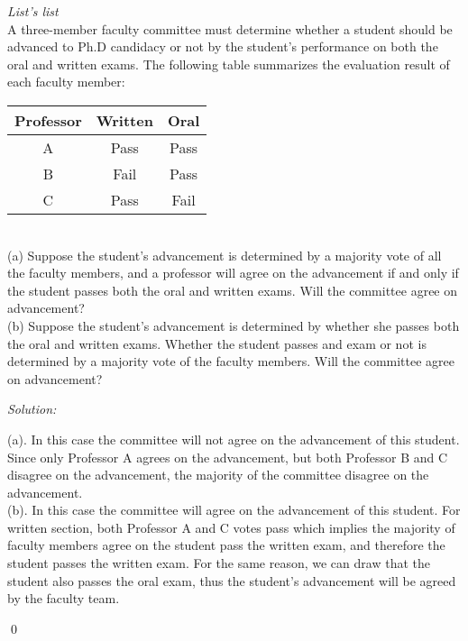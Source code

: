 \documentclass[12pt]{article}
\newenvironment{problem}[2][Problem]{\begin{trivlist}
\item[\hskip \labelsep {\bfseries #1}\hskip \labelsep {\bfseries #2.}]}{\end{trivlist}}
\newenvironment{sol}
    {\emph{Solution:}
    }
    {
    \qed
    }
\begin{document}
\begin{problem}{2}
	\textit{List's list} \\
	A three-member faculty committee must determine whether a student should be advanced to Ph.D candidacy or not by the student's performance on both the oral and written exams. The following table summarizes the evaluation result of each faculty member:\\
	\begin{table}[h!]
		\centering
		\begin{tabular}{|c|c|c|}
			\hline
			Professor      & Written & Oral \\ \hline
			A & Pass & Pass \\ \hline
			B & Fail & Pass \\ \hline
			C & Pass & Fail \\ \hline
		\end{tabular}
	\end{table}\\
	(a) Suppose the student's advancement is determined by a majority vote of all the faculty members, and a professor will agree on the advancement if and only if the student passes both the oral and written exams. Will the committee agree on advancement?\\
	(b) Suppose the student's advancement is determined by whether she passes both the oral and written exams. Whether the student passes and exam or not is determined by a majority vote of the faculty members. Will the committee agree on advancement?
\end{problem}
\begin{sol}
	(a). In this case the committee will not agree on the advancement of this student. Since only Professor A agrees on the advancement, but both Professor B and C disagree on the advancement, the majority of the committee disagree on the advancement. \\
	(b). In this case the committee will agree on the advancement of this student. For written section, both Professor A and C votes pass which implies the majority of faculty members agree on the student pass the written exam, and therefore the student passes the written exam. For the same reason, we can draw that the student also passes the oral exam, thus the student's advancement will be agreed by the faculty team.
\end{sol}
\vspace{4cm}
\end{document}
